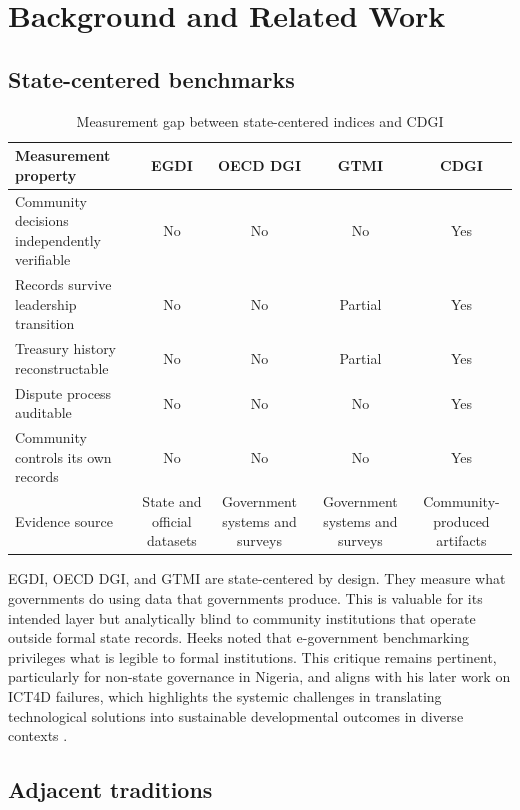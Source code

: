 \documentclass[sigconf]{acmart}
\begin{document}
\section{Background and Related Work}

\subsection{State-centered benchmarks}

\begin{table}[t]
\caption{Measurement gap between state-centered indices and CDGI}
\label{tab:gap}
\small
\begin{tabularx}{\textwidth}{Ycccc}
\toprule
Measurement property & EGDI & OECD DGI & GTMI & CDGI \\
\midrule
Community decisions independently verifiable & No & No & No & Yes \\
Records survive leadership transition & No & No & Partial & Yes \\
Treasury history reconstructable & No & No & Partial & Yes \\
Dispute process auditable & No & No & No & Yes \\
Community controls its own records & No & No & No & Yes \\
Evidence source & State and official datasets & Government systems and surveys & Government systems and surveys & Community-produced artifacts \\
\bottomrule
\end{tabularx}
\end{table}


EGDI, OECD DGI, and GTMI are state-centered by design. They measure what governments do using data that governments produce. This is valuable for its intended layer but analytically blind to community institutions that operate outside formal state records. Heeks \cite{heeks2006} noted that e-government benchmarking privileges what is legible to formal institutions. This critique remains pertinent, particularly for non-state governance in Nigeria, and aligns with his later work on ICT4D failures, which highlights the systemic challenges in translating technological solutions into sustainable developmental outcomes in diverse contexts \cite{heeks2002, heeks2003}.

\subsection{Adjacent traditions}
\end{document}
